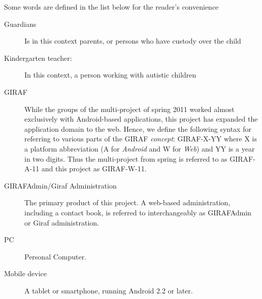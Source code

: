 Some words are defined in the list below for the reader's convenience
\begin{description}
\item[Guardians] Is in this context parents, or persons who have custody over the child
\item[Kindergarten teacher:] In this context, a person working with autistic children
\item[GIRAF] While the groups of the multi-project of spring 2011 worked almost exclusively with Android-based applications, this project has expanded the application domain to the web. Hence, we define the following syntax for referring to various parts of the GIRAF \emph{concept}: GIRAF-X-YY where X is a platform abbreviation (A for \emph{Android} and W for \emph{Web}) and YY is a year in two digits. Thus the multi-project from spring is referred to as GIRAF-A-11 and this project as GIRAF-W-11.
\item[GIRAFAdmin/Giraf Administration] The primary product of this project. A web-based administration, including a contact book, is referred to interchangeably as GIRAFAdmin or Giraf administration.
\item[PC] Personal Computer.
\item[Mobile device] A tablet or smartphone, running Android 2.2 or later.
\end{description}


